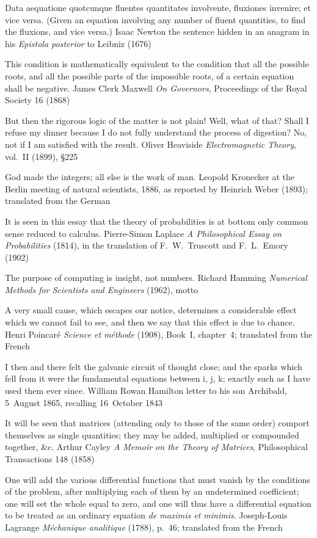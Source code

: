   {Data aequatione quotcunque fluentes quantitates involvente, fluxiones invenire; et vice versa.
   \textup{(}Given an equation involving any number of fluent quantities, to find the fluxions,
   and vice versa.\textup{)}}
  {Isaac Newton}
  {the sentence hidden in an anagram in his \emph{Epistola posterior} to Leibniz (1676)}

  {This condition is mathematically equivalent to the condition that all the possible roots, and
   all the possible parts of the impossible roots, of a certain equation shall be negative.}
  {James Clerk Maxwell}
  {\emph{On Governors}, Proceedings of the Royal Society 16 (1868)}

  {But then the rigorous logic of the matter is not plain! Well, what of that? Shall I refuse my
   dinner because I do not fully understand the process of digestion? No, not if I am satisfied
   with the result.}
  {Oliver Heaviside}
  {\emph{Electromagnetic Theory}, vol.~II (1899), §225}

  {God made the integers; all else is the work of man.}
  {Leopold Kronecker}
  {at the Berlin meeting of natural scientists, 1886, as reported by Heinrich Weber (1893);
   translated from the German}

  {It is seen in this essay that the theory of probabilities is at bottom only common sense
   reduced to calculus.}
  {Pierre-Simon Laplace}
  {\emph{A Philosophical Essay on Probabilities} (1814), in the translation of F.~W.~Truscott and
   F.~L.~Emory (1902)}

  {The purpose of computing is insight, not numbers.}
  {Richard Hamming}
  {\emph{Numerical Methods for Scientists and Engineers} (1962), motto}

  {A very small cause, which escapes our notice, determines a considerable effect which we cannot
   fail to see, and then we say that this effect is due to chance.}
  {Henri Poincaré}
  {\emph{Science et méthode} (1908), Book~I, chapter~4; translated from the French}

  {I then and there felt the galvanic circuit of thought close; and the sparks which fell from it
   were the fundamental equations between i, j, k; exactly such as I have used them ever since.}
  {William Rowan Hamilton}
  {letter to his son Archibald, 5~August 1865, recalling 16~October 1843}

  {It will be seen that matrices (attending only to those of the same order) comport themselves
   as single quantities; they may be added, multiplied or compounded together, \&c.}
  {Arthur Cayley}
  {\emph{A Memoir on the Theory of Matrices}, Philosophical Transactions 148 (1858)}

  {One will add the various differential functions that must vanish by the conditions of the
   problem, after multiplying each of them by an undetermined coefficient; one will set the whole
   equal to zero, and one will thus have a differential equation to be treated as an ordinary
   equation \emph{de maximis et minimis}.}
  {Joseph-Louis Lagrange}
  {\emph{Méchanique analitique} (1788), p.~46; translated from the French}
